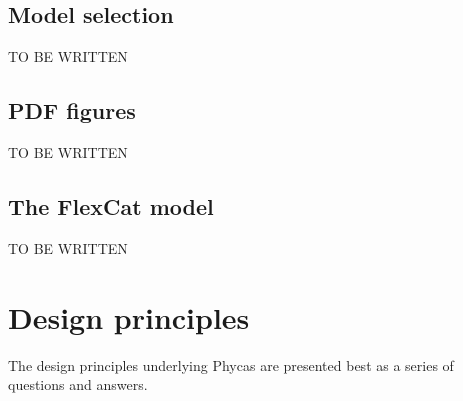 \documentclass[10pt]{article}
\begin{document}
\subsection{Model selection}

TO BE WRITTEN 

\subsection{PDF figures}

TO BE WRITTEN 

\subsection{The FlexCat model}

TO BE WRITTEN 

%

\section{Design principles}\label{sec:designprinciples}

The design principles underlying Phycas are presented best as a series of questions and answers.
\end{document}
